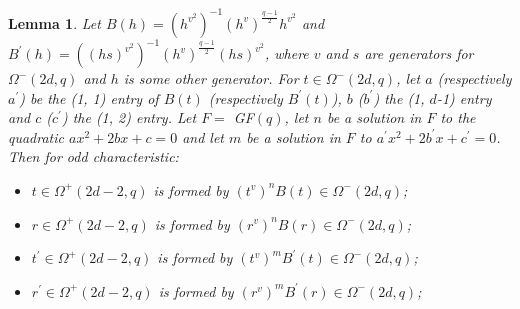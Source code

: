 \documentclass[12pt]{report}
\newtheorem{lemma}[definition]{Lemma}
\begin{document}
\begin{lemma}
Let $B(h) = (h^{v^2})^{-1} ({h^v})^{\frac{q-1}{2}}h^{v^2}$ and $B^\prime(h) = ((hs)^{v^2})^{-1} ({h^v})^{\frac{q-1}{2}}(hs)^{v^2}$, where $v$ and $s$ are generators for $\Omega^-(2d, q)$ and $h$ is some other generator. For $t \in \Omega^-(2d, q)$, let $a$ (respectively $a^\prime$) be the (1, 1) entry of $B(t)$ (respectively $B^\prime(t)$), $b$ ($b^\prime$) the (1, $d$-1) entry and $c$ ($c^\prime$) the (1, 2) entry. Let $F =$ GF$(q)$, let $n$ be a solution in $F$ to the quadratic $ax^2 + 2bx + c = 0$ and let $m$ be a solution in $F$ to $a^\prime x^2 + 2b^\prime x + c^\prime = 0$. Then for odd characteristic:
\begin{itemize}
\item $t \in \Omega^+(2d-2, q)$ is formed by $({t^v})^n B(t) \in \Omega^-(2d, q)$;
\item $r \in \Omega^+(2d-2, q)$ is formed by $({r^v})^n B(r) \in \Omega^-(2d, q)$;
\item $t^\prime \in \Omega^+(2d-2, q)$ is formed by $({t^v})^m B^\prime(t) \in \Omega^-(2d, q)$;
\item $r^\prime \in \Omega^+(2d-2, q)$ is formed by $({r^v})^m B^\prime(r) \in \Omega^-(2d, q)$;
\end{itemize}

\end{lemma}
\end{document}
